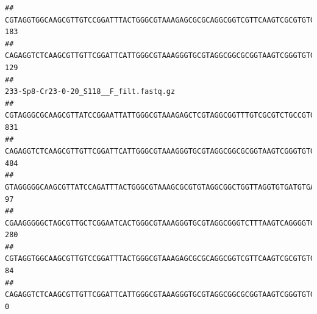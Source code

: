 \documentclass[]{article}
\begin{document}
\begin{verbatim}
## CGTAGGTGGCAAGCGTTGTCCGGATTTACTGGGCGTAAAGAGCGCGCAGGCGGTCGTTCAAGTCGCGTGTGAAAGCCCCCGGCTCAACTGGGGAGGGTCACGCGATACTGATCGACTCGAAGGCAGGAGAGGGTAGTGGAATTCCCGGTGTAGTGGTGAAATGCGTAGATATCGGGAGGAACACCAGTGGCGAAGGCGACTACCTGGCCTGTTCTTGACGCTGAGGCGCGAAAGCTAGGGGAGCAAACG                                     183
## CAGAGGTCTCAAGCGTTGTTCGGATTCATTGGGCGTAAAGGGTGCGTAGGCGGCGCGGTAAGTCGGGTGTGAAATCTCGGGGCTTAACTCCGAAACTGCATTCGATACTGCCGTGCTTGAGGACTGGAGAGGAGACTGGAATTTACGGTGTAGCGGTGAAATGCGTAGATATCGTAAGGAAGACCAGTGGCGAAGGCGGGTCTCTGGACAGTTCCTGACGCTGAGGCACGAAGGCCAGGGGAGCAAACG                                     129
##                                                                                                                                                                                                                                                           233-Sp8-Cr23-0-20_S118__F_filt.fastq.gz
## CGTAGGGCGCAAGCGTTATCCGGAATTATTGGGCGTAAAGAGCTCGTAGGCGGTTTGTCGCGTCTGCCGTGAAAGTCCGGGGCTCAACTCCGGATCTGCGGTGGGTACGGGCAGACTAGAGTGATGTAGGGGAGACTGGAATTCCTGGTGTAGCGGTGAAATGCGCAGATATCAGGAGGAACACCGATGGCGAAGGCAGGTCTCTGGGCATTAACTGACGCTGAGGAGCGAAAGCATGGGGAGCGAACA                                     831
## CAGAGGTCTCAAGCGTTGTTCGGATTCATTGGGCGTAAAGGGTGCGTAGGCGGCGCGGTAAGTCGGGTGTGAAATCTCGGAGCTTAACTCCGAAACTGCATTCGATACTGCCGTGCTTGAGGACTGGAGAGGAGACTGGAATTTACGGTGTAGCGGTGAAATGCGTAGATATCGTAAGGAAGACCAGTGGCGAAGGCGGGTCTCTGGACAGTTCCTGACGCTGAGGCACGAAGGCCAGGGGAGCAAACG                                     484
## GTAGGGGGCAAGCGTTATCCAGATTTACTGGGCGTAAAGCGCGTGTAGGCGGCTGGTTAGGTGTGATGTGAAATCTTCCGGCTCAACCGGAAAACTGCATTGCAAACCGGCCTGGCTAGAGTGCAGGAGAGGGAAGCGGAATTCCAGGTGTAGCGGTGAAATGCGTAGATATCTGGAGGAACACCAGTGGCGAAGGCGGCTTCCTGGCCTGCAACTGACGCTGAGACGCGAAAGCGTGGGGAGCGAAC                                       97
## CGAAGGGGGCTAGCGTTGCTCGGAATCACTGGGCGTAAAGGGTGCGTAGGCGGGTCTTTAAGTCAGGGGTGAAATCCTGGAGCTCAACTCCAGAACTGCCTTTGATACTGAAGATCTTGAGTTCGGGAGAGGTGAGTGGAACTGCGAGTGTAGAGGTGAAATTCGTAGATATTCGCAAGAACACCAGTGGCGAAGGCGGCTCACTGGCCCGATACTGACGCTGAGGCACGAAAGCGTGGGGAGCAAACA                                     280
## CGTAGGTGGCAAGCGTTGTCCGGATTTACTGGGCGTAAAGAGCGCGCAGGCGGTCGTTCAAGTCGCGTGTGAAAGCCCCCGGCTCAACTGGGGAGGGTCACGCGATACTGATCGACTCGAAGGCAGGAGAGGGTAGTGGAATTCCCGGTGTAGTGGTGAAATGCGTAGATATCGGGAGGAACACCAGTGGCGAAGGCGACTACCTGGCCTGTTCTTGACGCTGAGGCGCGAAAGCTAGGGGAGCAAACG                                      84
## CAGAGGTCTCAAGCGTTGTTCGGATTCATTGGGCGTAAAGGGTGCGTAGGCGGCGCGGTAAGTCGGGTGTGAAATCTCGGGGCTTAACTCCGAAACTGCATTCGATACTGCCGTGCTTGAGGACTGGAGAGGAGACTGGAATTTACGGTGTAGCGGTGAAATGCGTAGATATCGTAAGGAAGACCAGTGGCGAAGGCGGGTCTCTGGACAGTTCCTGACGCTGAGGCACGAAGGCCAGGGGAGCAAACG                                       0

\end{verbatim}
\end{document}
